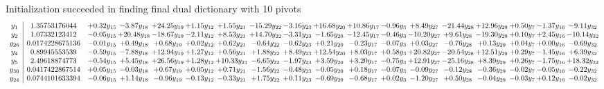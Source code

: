\documentclass[9pt]{article}
\begin{document}
Initialization succeeded in finding final dual dictionary with 10 pivots
\[\begin{array}{c| c c@{\hskip 2pt} c@{\hskip 2pt} c@{\hskip 2pt} c@{\hskip 2pt} c@{\hskip 2pt} c@{\hskip 2pt} c@{\hskip 2pt} c@{\hskip 2pt} c@{\hskip 2pt} c@{\hskip 2pt} c@{\hskip 2pt} c@{\hskip 2pt} c@{\hskip 2pt} c@{\hskip 2pt} c@{\hskip 2pt} c@{\hskip 2pt} }
 y_{1}   &  1.35753176044 & +  0.32 y_{15} & -3.87 y_{18} & + 24.25 y_{19} & +  1.15 y_{12} & +  1.55 y_{21} & -15.29 y_{22} & -3.16 y_{23} & + 16.68 y_{20} & + 10.86 y_{17} & -0.96 y_{3} & +  8.49 y_{27} & -21.44 y_{28} & + 12.96 y_{29} & +  0.50 y_{7} & -1.37 y_{16} & -9.11 y_{32}\\
 y_{2}   &  1.07332123412 & -0.05 y_{15} & + 20.48 y_{18} & -18.67 y_{19} & -2.11 y_{12} & +  8.53 y_{21} & + 14.70 y_{22} & -3.31 y_{23} & -1.65 y_{20} & -12.45 y_{17} & -0.46 y_{3} & -10.20 y_{27} & +  9.61 y_{28} & -19.30 y_{29} & +  0.10 y_{7} & +  2.45 y_{16} & -10.14 y_{32}\\
 y_{26}   &  0.0174228675136 & -0.01 y_{15} & +  0.49 y_{18} & +  0.68 y_{19} & +  0.02 y_{12} & +  0.62 y_{21} & -0.64 y_{22} & -0.62 y_{23} & +  0.21 y_{20} & -0.23 y_{17} & -0.07 y_{3} & +  0.03 y_{27} & -0.76 y_{28} & +  0.13 y_{29} & +  0.04 y_{7} & +  0.00 y_{16} & -0.69 y_{32}\\
 y_{4}   &  0.89945553539 & -0.59 y_{15} & -7.88 y_{18} & + 12.94 y_{19} & +  1.27 y_{12} & +  0.56 y_{21} & +  1.88 y_{22} & +  8.49 y_{23} & + 12.54 y_{20} & +  8.03 y_{17} & +  0.58 y_{3} & + 20.82 y_{27} & -20.54 y_{28} & + 12.51 y_{29} & +  0.29 y_{7} & -1.45 y_{16} & +  6.39 y_{32}\\
 y_{5}   &  2.49618874773 & -0.54 y_{15} & +  5.45 y_{18} & + 26.56 y_{19} & +  1.28 y_{12} & + 10.33 y_{21} & -6.65 y_{22} & -1.97 y_{23} & +  3.59 y_{20} & +  3.20 y_{17} & -0.75 y_{3} & + 12.91 y_{27} & -25.16 y_{28} & +  8.39 y_{29} & +  0.26 y_{7} & -1.75 y_{16} & + 18.32 y_{32}\\
 y_{30}   &  0.0417422867514 & +  0.05 y_{15} & -0.03 y_{18} & +  0.67 y_{19} & +  0.05 y_{12} & +  0.71 y_{21} & -1.56 y_{22} & -0.48 y_{23} & -0.05 y_{20} & +  0.18 y_{17} & -0.07 y_{3} & -0.09 y_{27} & -0.12 y_{28} & -0.36 y_{29} & -0.02 y_{7} & -0.05 y_{16} & -0.22 y_{32}\\
 y_{24}   &  0.0744101633394 & -0.06 y_{15} & +  1.14 y_{18} & -0.96 y_{19} & -0.13 y_{12} & -0.33 y_{21} & +  1.75 y_{22} & +  0.11 y_{23} & -0.69 y_{20} & -0.68 y_{17} & +  0.02 y_{3} & -1.20 y_{27} & +  0.50 y_{28} & -0.04 y_{29} & -0.03 y_{7} & +  0.12 y_{16} & -0.02 y_{32}\\

\end{array}\]
\end{document}
